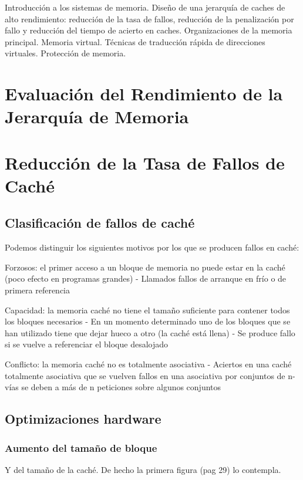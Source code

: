 \documentclass[12pt,onecolumn]{memoir}
\begin{document}
Introducción a los sistemas de memoria. Diseño de una jerarquía de caches de alto rendimiento: reducción de la tasa de fallos,  reducción de la penalización por fallo y reducción del tiempo de acierto en caches. Organizaciones de la memoria principal. Memoria virtual. Técnicas de traducción rápida de direcciones virtuales. Protección de memoria.

\section{Evaluación del Rendimiento de la Jerarquía de Memoria}

\section{Reducción de la Tasa de Fallos de Caché}

\subsection{Clasificación de fallos de caché}

Podemos distinguir los siguientes motivos por los que se 
producen fallos en caché:

Forzosos: el primer acceso a un bloque de memoria no puede 
estar en la caché (poco efecto en programas grandes)
- Llamados fallos de arranque en frío o de primera referencia

Capacidad: la memoria caché no tiene el tamaño suficiente para 
contener todos los bloques necesarios
- En un momento determinado uno de los bloques que se han 
utilizado tiene que dejar hueco a otro (la caché está llena)
- Se produce fallo si se vuelve a referenciar el bloque desalojado

Conflicto: la memoria caché no es totalmente asociativa 
- Aciertos en una caché totalmente asociativa que se vuelven 
fallos en una asociativa por conjuntos de 
n-vías se deben a más de n peticiones sobre algunos conjuntos

\subsection{Optimizaciones hardware}

\subsubsection{Aumento del tamaño de bloque}

Y del tamaño de la caché. De hecho la primera figura (pag 29) lo contempla.
\end{document}
